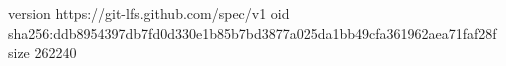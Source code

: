 version https://git-lfs.github.com/spec/v1
oid sha256:ddb8954397db7fd0d330e1b85b7bd3877a025da1bb49cfa361962aea71faf28f
size 262240
